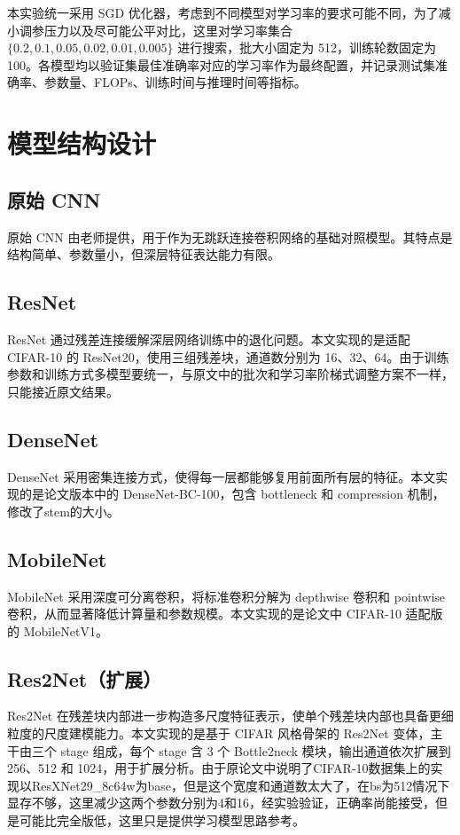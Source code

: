 \documentclass[a4paper]{article}
\begin{document}
本实验统一采用 SGD 优化器，考虑到不同模型对学习率的要求可能不同，为了减小调参压力以及尽可能公平对比，这里对学习率集合 $\{0.2, 0.1, 0.05, 0.02, 0.01, 0.005\}$ 进行搜索，批大小固定为 512，训练轮数固定为 100。各模型均以验证集最佳准确率对应的学习率作为最终配置，并记录测试集准确率、参数量、FLOPs、训练时间与推理时间等指标。

\section{模型结构设计}
\subsection{原始 CNN}
原始 CNN 由老师提供，用于作为无跳跃连接卷积网络的基础对照模型。其特点是结构简单、参数量小，但深层特征表达能力有限。

\subsection{ResNet}
ResNet 通过残差连接缓解深层网络训练中的退化问题\cite{resnet}。本文实现的是适配 CIFAR-10 的 ResNet20，使用三组残差块，通道数分别为 16、32、64。由于训练参数和训练方式多模型要统一，与原文中的批次和学习率阶梯式调整方案不一样，只能接近原文结果。

\subsection{DenseNet}
DenseNet 采用密集连接方式，使得每一层都能够复用前面所有层的特征\cite{densenet}。本文实现的是论文版本中的 DenseNet-BC-100，包含 bottleneck 和 compression 机制，修改了stem的大小。

\subsection{MobileNet}
MobileNet 采用深度可分离卷积，将标准卷积分解为 depthwise 卷积和 pointwise 卷积，从而显著降低计算量和参数规模\cite{mobilenet}。本文实现的是论文中 CIFAR-10 适配版的 MobileNetV1。

\subsection{Res2Net（扩展）}
Res2Net 在残差块内部进一步构造多尺度特征表示，使单个残差块内部也具备更细粒度的尺度建模能力\cite{Res2Net}。本文实现的是基于 CIFAR 风格骨架的 Res2Net 变体，主干由三个 stage 组成，每个 stage 含 3 个 Bottle2neck 模块，输出通道依次扩展到 256、512 和 1024，用于扩展分析。由于原论文中说明了CIFAR-10数据集上的实现以ResXNet29\_8c64w为base，但是这个宽度和通道数太大了，在bs为512情况下显存不够，这里减少这两个参数分别为4和16，经实验验证，正确率尚能接受，但是可能比完全版低，这里只是提供学习模型思路参考。
\end{document}
